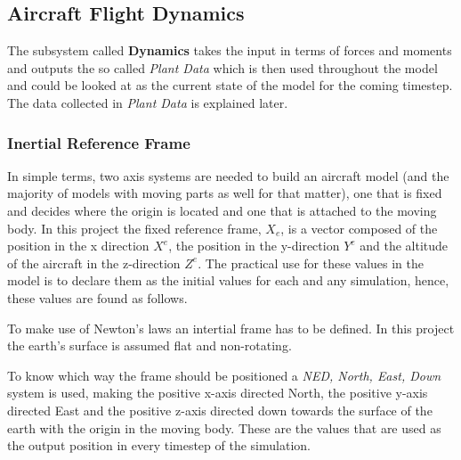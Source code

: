 \subsection{Aircraft Flight Dynamics}


The subsystem called \textbf{Dynamics} takes the input in terms of forces and moments and outputs the so called \textit{Plant Data} which is then used throughout the model and could be looked at as the current state of the model for the coming timestep. The data collected in \textit{Plant Data} is explained later.

\subsubsection{Inertial Reference Frame}

In simple terms, two axis systems are needed to build an aircraft model (and the majority of models with moving parts as well for that matter), one that is fixed and decides where the origin is located and one that is attached to the moving body. In this project the fixed reference frame, \textbf{$X_e$}, is a vector composed of the position in the x direction $X^e$, the position in the y-direction $Y^e$ and the altitude of the aircraft in the z-direction $Z^e$. The practical use for these values in the model is to declare them as the initial values for each and any simulation, hence, these values are found as follows.



%
%
To make use of Newton's laws an intertial frame has to be defined. In this project the earth's surface is assumed flat and non-rotating.
%

To know which way the frame should be positioned a \textit{NED, North, East, Down} system is used, making the positive x-axis directed North, the positive y-axis directed East and the positive z-axis directed down towards the surface of the earth with the origin in the moving body. These are the values that are used as the output position in every timestep of the simulation.

